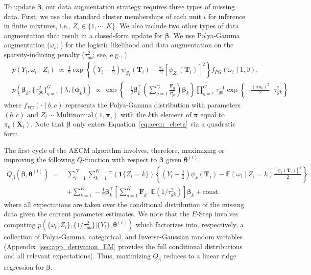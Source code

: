 \documentclass[11pt]{article}
\newcommand\E{\mathbb{E}}
\newcommand\bT{\bm{T}}
\newcommand\bX{\bm{X}}
\begin{document}
To update $\bm{\beta}$, our data augmentation strategy requires three
types of missing data.  First, we use the standard cluster memberships of each
unit $i$ for inference in finite mixtures, i.e.,
$Z_i \in \{1, \cdots, K\}$.  We also include two other types of data
augmentation that result in a closed-form update for $\bm{\beta}$.  We
use Polya-Gamma augmentation ($\omega_i$;
\citealt{polson2013polyagamma}) for the logistic likelihood and data
augmentation on the sparsity-inducing penalty ($\tau^2_{gk}$; see,
e.g.,
\citealt{figueiredo2003adaptive,polson2011svm,ratkovic2017sparse,goplerud2021sparsity}).
\begin{subequations}
\label{eq:aecm_ebeta}
\begin{align}
&p(Y_i, \omega_{i} \mid Z_i) \ \propto \ \frac{1}{2}\exp\left\{\left(Y_i - \frac{1}{2}\right) \psi_{Z_i}(\bT_i) - \frac{\omega_{i}}{2} \left[\psi_{Z_i}(\bT_i)\right]^2\right\} f_{PG}(\omega_{i} \mid 1, 0),\label{eq:augmented1} \\
&p(\bm{\beta}_k, \{\tau^2_{gk}\}_{g=1}^G \mid \lambda,
\{\bm{\phi}_k\}) \ \propto \
\exp\left\{-\frac{1}{2}\bm{\beta}_k^\top\left(\sum_{g=1}^G
\frac{\bm{F}_{g}}{\tau^2_{gk}}\right)
\bm{\beta}_k\right\} \prod_{g=1}^G\tau_{gk}^{-1}
\exp\left\{-\frac{\left(\lambda \bar{\pi}_k\right)^2}{2} \cdot \tau^2_{gk}\right\} \label{eq:augmented2}
\end{align}
\end{subequations}
where $f_{PG}(\cdot \mid b, c)$ represents the Polya-Gamma
distribution with parameters $(b,c)$ and
$Z_i \sim \mathrm{Multinomial}\left(1, \bm{\pi}_i\right)$ with the
$k$th element of $\bm{\pi}$ equal to $\pi_k(\bX_i)$. Note that
$\bm{\beta}$ only enters Equation~\eqref{eq:aecm_ebeta} via a
quadratic form.

The first cycle of the AECM algorithm involves, therefore, maximizing
or improving the following $Q$-function with respect to $\bm{\beta}$
given $\bm{\theta}^{(t)}$.
\begin{align}
\label{eq:aecm_qbeta}
Q_\beta\left(\bm{\beta}, \bm{\theta}^{(t)}\right)\ = \ &\sum_{i=1}^N \sum_{k=1}^K \E(\mathbf{1}\{Z_i = k\})\left\{\left(Y_i -
\frac{1}{2}\right) \psi_{k}(\bT_i) - \E(\omega_i \mid Z_i = k)
\frac{\left[\psi_k(\bT_i)\right]^2}{2}\right\}  \nonumber \\
                                                  & + \sum_{k=1}^K -\frac{1}{2}
\bm{\beta}_k^\top \left[\sum_{g=1}^K \bm{F}_g \cdot
\E(1/\tau^2_{gk})\right] \bm{\beta}_k + \text{const.}
\end{align}
where all expectations are taken over the conditional distribution of
the missing data given the current parameter estimates.  We note that
the $E$-Step involves computing
$p(\{\omega_i, Z_i\}, \{1/\tau^2_{gk}\} | \{Y_i\}, \bm{\theta}^{(t)})$
which factorizes into, respectively, a collection of Polya-Gamma,
categorical, and Inverse-Gaussian random variables
(Appendix~\ref{sec:app_derivation_EM} provides the full conditional
distributions and all relevant expectations).  Thus, maximizing
$Q_\beta$ reduces to a linear ridge regression for $\bm{\beta}$.
\end{document}

